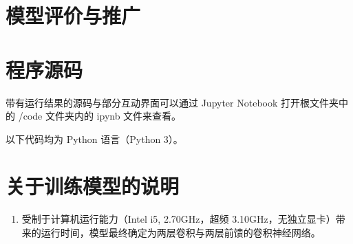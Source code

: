 \documentclass[UTF8]{ctexart}
\begin{document}
\section{模型评价与推广}

\clearpage
\appendix
\appendixname
\section{程序源码}
带有运行结果的源码与部分互动界面可以通过 Jupyter Notebook 打开根文件夹中的 /code 文件夹内的 ipynb 文件来查看。

以下代码均为 Python 语言（Python 3）。

\section{关于训练模型的说明}
\begin{enumerate}
\item 受制于计算机运行能力（Intel i5, 2.70GHz，超频 3.10GHz，无独立显卡）带来的运行时间，模型最终确定为两层卷积与两层前馈的卷积神经网络。
\end{enumerate}
\end{document}
